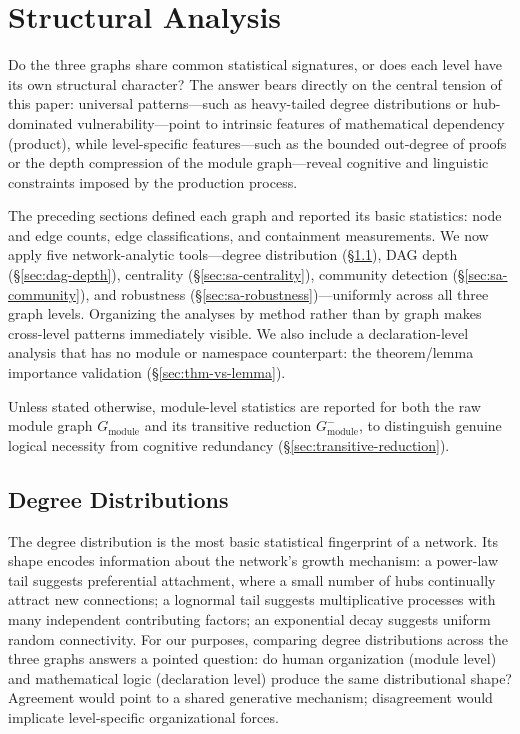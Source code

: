 \section{Structural Analysis}
\label{sec:structural-analysis}

Do the three graphs share common statistical signatures, or does each level have its own structural character? The answer bears directly on the central tension of this paper: universal patterns---such as heavy-tailed degree distributions or hub-dominated vulnerability---point to intrinsic features of mathematical dependency (product), while level-specific features---such as the bounded out-degree of proofs or the depth compression of the module graph---reveal cognitive and linguistic constraints imposed by the production process.

The preceding sections defined each graph and reported its basic statistics: node and edge counts, edge classifications, and containment measurements. We now apply five network-analytic tools---degree distribution (\S\ref{sec:sa-degree}), DAG depth (\S\ref{sec:dag-depth}), centrality (\S\ref{sec:sa-centrality}), community detection (\S\ref{sec:sa-community}), and robustness (\S\ref{sec:sa-robustness})---uniformly across all three graph levels. Organizing the analyses by method rather than by graph makes cross-level patterns immediately visible. We also include a declaration-level analysis that has no module or namespace counterpart: the theorem/lemma importance validation (\S\ref{sec:thm-vs-lemma}).

Unless stated otherwise, module-level statistics are reported for both the raw module graph $G_{\mathrm{module}}$ and its transitive reduction $G_{\mathrm{module}}^{-}$, to distinguish genuine logical necessity from cognitive redundancy (\S\ref{sec:transitive-reduction}).

\subsection{Degree Distributions}
\label{sec:sa-degree}

The degree distribution is the most basic statistical fingerprint of a network. Its shape encodes information about the network's growth mechanism: a power-law tail suggests preferential attachment, where a small number of hubs continually attract new connections; a lognormal tail suggests multiplicative processes with many independent contributing factors; an exponential decay suggests uniform random connectivity. For our purposes, comparing degree distributions across the three graphs answers a pointed question: do human organization (module level) and mathematical logic (declaration level) produce the same distributional shape? Agreement would point to a shared generative mechanism; disagreement would implicate level-specific organizational forces.

